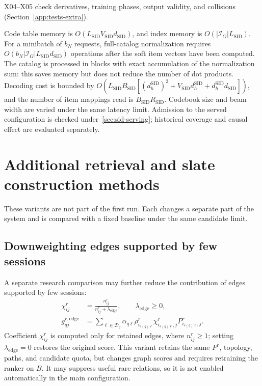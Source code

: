 \documentclass[12pt,a4paper]{article}
\theoremstyle{plainru}
\begin{document}
X04--X05 check derivatives, training phases, output validity, and collisions
(Section~\ref{app:tests-extra}).

Code table memory is
$O(L_{\mathrm{SID}}V_{\mathrm{SID}}d_{\mathrm{SID}})$,
and index memory is $O(|\mathcal I_G|L_{\mathrm{SID}})$.
For a minibatch of $b_N$ requests, full-catalog normalization requires
$O(b_N|\mathcal I_G|L_{\mathrm{SID}}d_{\mathrm{SID}})$ operations
after the soft item vectors have been computed. The catalog is processed
in blocks with exact accumulation of the normalization sum: this saves memory
but does not reduce the number of dot products.
Decoding cost is bounded by
$O(L_{\mathrm{SID}}B_{\mathrm{SID}}
[(d_h^{\mathrm{SID}})^2+V_{\mathrm{SID}}d_h^{\mathrm{SID}}
+d_h^{\mathrm{SID}}d_{\mathrm{SID}}])$,
and the number of item mappings read is
$B_{\mathrm{SID}}R_{\mathrm{SID}}$.
Codebook size and beam width are varied under the same latency limit.
Admission to the served configuration is checked under~\ref{sec:sid-serving};
historical coverage and causal effect are evaluated separately.

\section{Additional retrieval and slate construction methods}\label{sec:model-extensions}

These variants are not part of the first run. Each changes a separate part
of the system and is compared with a fixed baseline under the same candidate limit.

\subsection{Downweighting edges supported by few sessions}\label{sec:model-edge-optional}

A separate research comparison may further reduce
the contribution of edges supported by few sessions:
\begin{align}\label{eq:model-edge-ablation}
\chi^r_{ij}&=\frac{n^r_{ij}}{n^r_{ij}+\lambda_{\mathrm{edge}}},
\qquad \lambda_{\mathrm{edge}}\ge0,\nonumber\\
g^{r,\mathrm{edge}}_{qj}
&=\sum_{\ell\in\mathcal D_q}\alpha_{q\ell}
\rho^r_{i_{s(q)\ell}}\chi^r_{i_{s(q)\ell},j}
P^r_{i_{s(q)\ell},j}.
\end{align}
Coefficient $\chi^r_{ij}$ is computed only for retained edges,
where $n^r_{ij}\ge1$; setting $\lambda_{\mathrm{edge}}=0$ restores
the original score. This variant retains the same $P^r$, topology,
paths, and candidate quota, but changes graph scores and requires
retraining the ranker on $B$. It may suppress useful rare
relations, so it is not enabled automatically in the main configuration.
\end{document}
